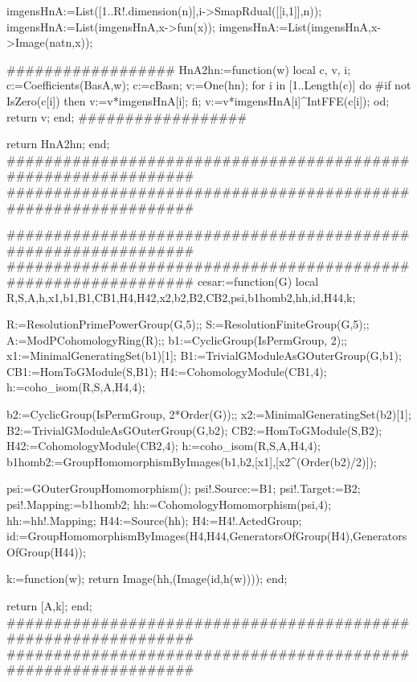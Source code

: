 imgensHnA:=List([1..R!.dimension(n)],i->SmapRdual([[i,1]],n));
imgensHnA:=List(imgensHnA,x->fun(x));
imgensHnA:=List(imgensHnA,x->Image(natn,x));

##################
HnA2hn:=function(w)
local c, v, i;
c:=Coefficients(BasA,w);
c:=c{Basn};
v:=One(hn);
for i in [1..Length(c)] do
#if not IsZero(c[i]) then v:=v*imgensHnA[i]; fi;
v:=v*imgensHnA[i]^IntFFE(c[i]);
od;
return v;
end;
##################



return HnA2hn;
end;
###############################################################
###############################################################


###############################################################
###############################################################
cesar:=function(G)
local R,S,A,h,x1,b1,B1,CB1,H4,H42,x2,b2,B2,CB2,psi,b1homb2,hh,id,H44,k;

R:=ResolutionPrimePowerGroup(G,5);;
S:=ResolutionFiniteGroup(G,5);;
A:=ModPCohomologyRing(R);;
b1:=CyclicGroup(IsPermGroup, 2);;
x1:=MinimalGeneratingSet(b1)[1];
B1:=TrivialGModuleAsGOuterGroup(G,b1);
CB1:=HomToGModule(S,B1);
H4:=CohomologyModule(CB1,4);
h:=coho_isom(R,S,A,H4,4);

b2:=CyclicGroup(IsPermGroup, 2*Order(G));;
x2:=MinimalGeneratingSet(b2)[1];
B2:=TrivialGModuleAsGOuterGroup(G,b2);
CB2:=HomToGModule(S,B2);
H42:=CohomologyModule(CB2,4);
h:=coho_isom(R,S,A,H4,4);
b1homb2:=GroupHomomorphismByImages(b1,b2,[x1],[x2^(Order(b2)/2)]);

psi:=GOuterGroupHomomorphism();
psi!.Source:=B1;
psi!.Target:=B2;
psi!.Mapping:=b1homb2;
hh:=CohomologyHomomorphism(psi,4);
hh:=hh!.Mapping;
H44:=Source(hh);
H4:=H4!.ActedGroup;
id:=GroupHomomorphismByImages(H4,H44,GeneratorsOfGroup(H4),GeneratorsOfGroup(H44));

k:=function(w);
return Image(hh,(Image(id,h(w))));
end;


return [A,k];
end;
###############################################################
###############################################################

